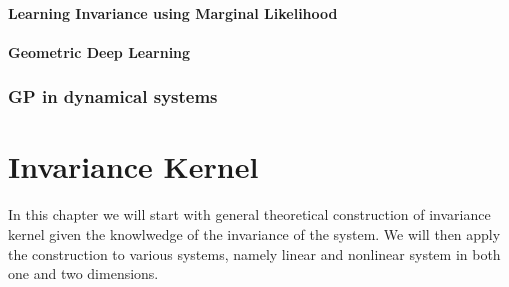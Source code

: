 \documentclass{statsmsc}
\begin{document}
\subsubsection{Learning Invariance using Marginal Likelihood}
\subsubsection{Geometric Deep Learning}
\subsection{GP in dynamical systems}



\chapter{Invariance Kernel}
In this chapter we will start with general theoretical construction of invariance kernel given the knowlwedge of the invariance of the system.
We will then apply the construction to various systems, namely linear and nonlinear system in both one and two dimensions.
\end{document}
